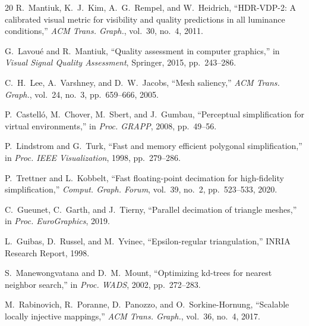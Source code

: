 \documentclass[10pt, twocolumn, a4paper]{article}
\begin{document}
\begin{thebibliography}{20}
R.~Mantiuk, K.~J.~Kim, A.~G.~Rempel, and W.~Heidrich,
``HDR-VDP-2: A calibrated visual metric for visibility and quality
predictions in all luminance conditions,''
\textit{ACM Trans. Graph.}, vol.~30, no.~4, 2011.

G.~Lavou{\'e} and R.~Mantiuk,
``Quality assessment in computer graphics,''
in \textit{Visual Signal Quality Assessment}, Springer, 2015,
pp.~243--286.

C.~H.~Lee, A.~Varshney, and D.~W.~Jacobs,
``Mesh saliency,''
\textit{ACM Trans. Graph.}, vol.~24, no.~3, pp.~659--666, 2005.

P.~Castell{\'o}, M.~Chover, M.~Sbert, and J.~Gumbau,
``Perceptual simplification for virtual environments,''
in \textit{Proc. GRAPP}, 2008, pp.~49--56.

P.~Lindstrom and G.~Turk,
``Fast and memory efficient polygonal simplification,''
in \textit{Proc. IEEE Visualization}, 1998, pp.~279--286.

P.~Trettner and L.~Kobbelt,
``Fast floating-point decimation for high-fidelity simplification,''
\textit{Comput. Graph. Forum}, vol.~39, no.~2, pp.~523--533, 2020.

C.~Gueunet, C.~Garth, and J.~Tierny,
``Parallel decimation of triangle meshes,''
in \textit{Proc. EuroGraphics}, 2019.

L.~Guibas, D.~Russel, and M.~Yvinec,
``Epsilon-regular triangulation,''
INRIA Research Report, 1998.

S.~Manewongvatana and D.~M.~Mount,
``Optimizing kd-trees for nearest neighbor search,''
in \textit{Proc. WADS}, 2002, pp.~272--283.

M.~Rabinovich, R.~Poranne, D.~Panozzo, and O.~Sorkine-Hornung,
``Scalable locally injective mappings,''
\textit{ACM Trans. Graph.}, vol.~36, no.~4, 2017.

\end{thebibliography}
\end{document}
